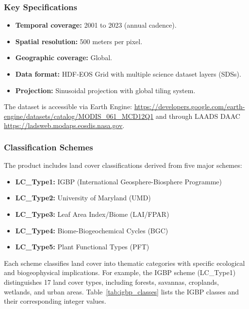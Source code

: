 \subsubsection{Key Specifications}
\begin{itemize}
    \item \textbf{Temporal coverage:} 2001 to 2023 (annual cadence).
    \item \textbf{Spatial resolution:} 500 meters per pixel.
    \item \textbf{Geographic coverage:} Global.
    \item \textbf{Data format:} HDF-EOS Grid with multiple science dataset layers (SDSs).
    \item \textbf{Projection:} Sinusoidal projection with global tiling system.
\end{itemize}

The dataset is accessible via Earth Engine: \url{https://developers.google.com/earth-engine/datasets/catalog/MODIS_061_MCD12Q1} and through LAADS DAAC \url{https://ladsweb.modaps.eosdis.nasa.gov}.

\subsubsection{Classification Schemes}
The product includes land cover classifications derived from five major schemes:
\begin{itemize}
    \item \textbf{LC\_Type1:} IGBP (International Geosphere-Biosphere Programme)
    \item \textbf{LC\_Type2:} University of Maryland (UMD)
    \item \textbf{LC\_Type3:} Leaf Area Index/Biome (LAI/FPAR)
    \item \textbf{LC\_Type4:} Biome-Biogeochemical Cycles (BGC)
    \item \textbf{LC\_Type5:} Plant Functional Types (PFT)
\end{itemize}

Each scheme classifies land cover into thematic categories with specific ecological and biogeophysical implications. For example, the IGBP scheme (LC\_Type1) distinguishes 17 land cover types, including forests, savannas, croplands, wetlands, and urban areas. Table~\ref{tab:igbp_classes} lists the IGBP classes and their corresponding integer values.

